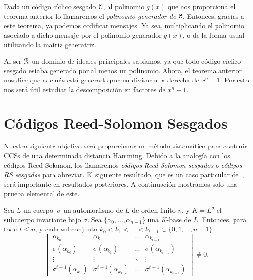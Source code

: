 Dado un código cíclico sesgado \(\mathcal{C}\), al polinomio \(g(x)\) que nos proporciona el teorema anterior lo llamaremos el \textit{polinomio generador de} \(\mathcal{C}\). Entonces, gracias a este teorema, ya podemos codificar mensajes. Ya sea, multiplicando el polinomio asociado a dicho mensaje por el polinomio generador \(g(x)\), o de la forma usual utilizando la matriz generatriz.

Al ser \(\mathcal{R}\) un dominio de ideales principales sabíamos, ya que todo código cíclico sesgado estaba generado por al menos un polinomio. Ahora, el teorema anterior nos dice que además está generado por un divisor a la derecha de \(x^{n} -1 \). Por esto nos será útil estudiar la descomposición en factores de \(x^{n} - 1\).
\section{Códigos Reed-Solomon Sesgados}%
\label{sec:códigos_reed_solomon_sesgados}

Nuestro siguiente objetivo será proporcionar un método sistemático para contruir CCSs de una determinada distancia Hamming. Debido a la analogía con los códigos Reed-Solomon, los llamaremos \textit{códigos Reed-Solomon sesgados} o \textit{códigos RS sesgados} para abreviar. El siguiente resultado, que es un caso particular de~\cite[Corolario 4.13]{lam_vandermonde_1988}, será importante en resultados posteriores. A continuación mostramos solo una prueba elemental de este.

\begin{lemma}
\label{lem:det_0}
    Sea \(L\) un cuerpo, \(\sigma\) un automorfismo de \(L\) de orden finito \(n\), y \(K = L^\sigma\) el subcuerpo invariante bajo \(\sigma\). Sea  \(\{\alpha_0, \dots, \alpha_{n-1}\}\) una \(K\)-base de \(L\). Entonces, para todo \(t \leq n\), y cada subconjunto \(k_0 < k_1 < \dots < k_{t-1} \subset \{0, 1, \dots, n-1\}\)
    \[
    \begin{vmatrix}
        \alpha_{k_0} & \alpha_{k_1} & \dots & \alpha_{k_{t -1}} \\
        \sigma(\alpha_{k_0}) & \sigma(\alpha_{k_1}) & \dots & \sigma(\alpha_{k_{t-1}}) \\
        \vdots & \vdots & \ddots & \vdots \\
        \sigma^{t-1}(\alpha_{k_0}) & \sigma^{t-1}(\alpha_{k_1}) & \dots & \sigma^{t-1}(\alpha_{k_{t-1}})
    \end{vmatrix}
    \neq 0
    .\]
\end{lemma}

